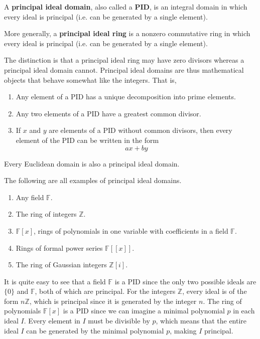   \begin{definition}
    A \textbf{principal ideal domain}, also called a \textbf{PID}, is an integral domain in which every ideal is principal (i.e. can be generated by a single element). 

    More generally, a \textbf{principal ideal ring} is a nonzero commutative ring in which every ideal is principal (i.e. can be generated by a single element). 
  \end{definition}

  The distinction is that a principal ideal ring may have zero divisors whereas a principal ideal domain cannot. Principal ideal domains are thus mathematical objects that behave somewhat like the integers. That is, 
  \begin{enumerate}
    \item Any element of a PID has a unique decomposition into prime elements. 
    \item Any two elements of a PID have a greatest common divisor. 
    \item If $x$ and $y$ are elements of a PID without common divisors, then every element of the PID can be written in the form 
      \begin{equation}
        a x + b y
      \end{equation}
  \end{enumerate}

  \begin{proposition}
    Every Euclidean domain is also a principal ideal domain. 
  \end{proposition}

  \begin{example}
    The following are all examples of principal ideal domains. 
    \begin{enumerate}
      \item Any field $\mathbb{F}$. 
      \item The ring of integers $\mathbb{Z}$. 
      \item $\mathbb{F}[x]$, rings of polynomials in one variable with coefficients in a field $\mathbb{F}$. 
      \item Rings of formal power series $\mathbb{F}[[x]]$. 
      \item The ring of Gaussian integers $\mathbb{Z}[i]$. 
    \end{enumerate}
  \end{example}

  It is quite easy to see that a field $\mathbb{F}$ is a PID since the only two possible ideals are $\{0\}$ and $\mathbb{F}$, both of which are principal. For the integers $\mathbb{Z}$, every ideal is of the form $n\mathbb{Z}$, which is principal since it is generated by the integer $n$. The ring of polynomials $\mathbb{F}[x]$ is a PID since we can imagine a minimal polynomial $p$ in each ideal $I$. Every element in $I$ must be divisible by $p$, which means that the entire ideal $I$ can be generated by the minimal polynomial $p$, making $I$ principal. 

